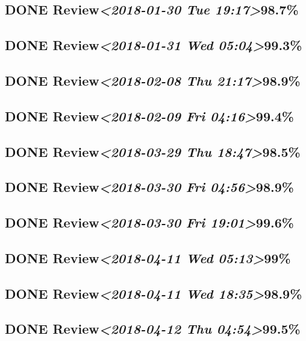 \documentclass[11pt]{ctexart}
\begin{document}
\subsection{{\bfseries\sffamily DONE} Review\textit{<2018-01-30 Tue 19:17>}98.7\%}
\label{sec:org5da8f3c}
\subsection{{\bfseries\sffamily DONE} Review\textit{<2018-01-31 Wed 05:04>}99.3\%}
\label{sec:org039a90b}
\subsection{{\bfseries\sffamily DONE} Review\textit{<2018-02-08 Thu 21:17>}98.9\%}
\label{sec:org99e0c9e}
\subsection{{\bfseries\sffamily DONE} Review\textit{<2018-02-09 Fri 04:16>}99.4\%}
\label{sec:org49bca37}
\subsection{{\bfseries\sffamily DONE} Review\textit{<2018-03-29 Thu 18:47>}98.5\%}
\label{sec:org6d9f979}
\subsection{{\bfseries\sffamily DONE} Review\textit{<2018-03-30 Fri 04:56>}98.9\%}
\label{sec:org811ea23}
\subsection{{\bfseries\sffamily DONE} Review\textit{<2018-03-30 Fri 19:01>}99.6\%}
\label{sec:org1262372}
\subsection{{\bfseries\sffamily DONE} Review\textit{<2018-04-11 Wed 05:13>}99\%}
\label{sec:org21d5097}
\subsection{{\bfseries\sffamily DONE} Review\textit{<2018-04-11 Wed 18:35>}98.9\%}
\label{sec:org7c64bbb}
\subsection{{\bfseries\sffamily DONE} Review\textit{<2018-04-12 Thu 04:54>}99.5\%}
\label{sec:orgb746aac}
\end{document}
